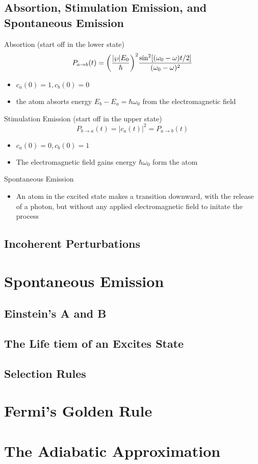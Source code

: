 \subsection{Absortion, Stimulation Emission, and Spontaneous Emission}
Absortion (start off in the lower state)
\[P_{a\rightarrow b}(t)=\qty(\frac{|\wp|E_0}{\hbar})^2\frac{\sin^2[(\omega_0-\omega)t/2]}{(\omega_0-\omega)^2}\]
\begin{itemize}
    \item \(c_a(0)=1, c_b(0)=0\)
    \item the atom absorts energy \(E_b-E_a=\hbar\omega_0\) from the electromagnetic field
\end{itemize}
Stimulation Emission (start off in the upper state)
\[P_{b\rightarrow a}(t)=|c_a(t)|^2=P_{a\rightarrow b}(t)\]
\begin{itemize}
    \item \(c_a(0)=0, c_b(0)=1\)
    \item The electromagnetic field gains energy \(\hbar\omega_0\) form the atom
\end{itemize}
Spontaneous Emission
\begin{itemize}
    \item An atom in the excited state makes a transition downward, with the release of a photon, but without any applied electromagnetic field to initate the process
\end{itemize}
\subsection{Incoherent Perturbations}
\section{Spontaneous Emission}
\subsection{Einstein's A and B}
\subsection{The Life tiem of an Excites State}
\subsection{Selection Rules}
\section{Fermi's Golden Rule}
\section{The Adiabatic Approximation}